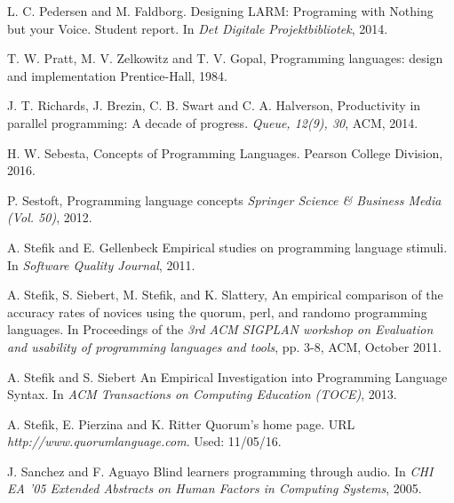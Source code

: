 \documentclass[preprint,10pt]{sigplanconf}
\begin{document}
\begin{thebibliography}{}
L. C. Pedersen and M. Faldborg. \newblock Designing LARM: Programing with Nothing but your Voice. \newblock Student report. In \emph{Det Digitale Projektbibliotek}, 2014.

T. W. Pratt, M. V. Zelkowitz and T. V.  Gopal, \newblock Programming languages: design and implementation \newblock Prentice-Hall, 1984.

J. T. Richards, J.  Brezin, C. B. Swart and C. A. Halverson, \newblock Productivity in parallel programming: A decade of progress. \newblock \emph{Queue, 12(9), 30}, ACM, 2014.

H. W. Sebesta, \newblock Concepts of Programming Languages. \newblock Pearson College Division, 2016.

P. Sestoft, \newblock Programming language concepts  \newblock \emph{Springer Science \& Business Media (Vol. 50)}, 2012.

A. Stefik and E. Gellenbeck \newblock Empirical studies on programming language stimuli. \newblock In \emph{Software Quality Journal}, 2011.

A. Stefik, S. Siebert, M. Stefik, and K. Slattery, \newblock An empirical comparison of the accuracy rates of novices using the quorum, perl, and randomo programming languages. \newblock In Proceedings of the \emph{3rd ACM SIGPLAN workshop on Evaluation and usability of programming languages and tools}, pp. 3-8, ACM, October 2011.

A. Stefik and S. Siebert \newblock An Empirical Investigation into Programming Language Syntax. \newblock In \emph{ACM Transactions on Computing Education (TOCE)}, 2013.

A. Stefik, E. Pierzina and K. Ritter \newblock Quorum's home page. \newblock URL \emph{http://www.quorumlanguage.com}. \newblock Used: 11/05/16.

J. Sanchez and F. Aguayo \newblock Blind learners programming through audio. \newblock In \emph{CHI EA '05 Extended Abstracts on Human Factors in Computing Systems}, 2005.


\end{thebibliography}
\end{document}
